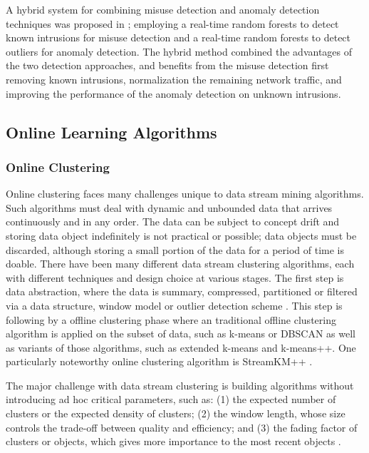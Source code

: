 \documentclass[runningheads]{llncs}
\begin{document}
	A hybrid system for combining misuse detection and anomaly detection techniques was proposed in \cite{Zhang2006}; employing a real-time random forests to detect known intrusions for misuse detection and a real-time random forests to detect outliers for anomaly detection. The hybrid method combined the advantages of the two detection approaches, and benefits from the misuse detection first removing known intrusions, normalization the remaining network traffic, and improving the performance of the anomaly detection on unknown intrusions.
	
	\subsection{Online Learning Algorithms}
	
	\subsubsection{Online Clustering}
	
	Online clustering faces many challenges unique to data stream mining algorithms. Such algorithms must deal with dynamic and unbounded data that arrives continuously and in any order. The data can be subject to concept drift and storing data object indefinitely is not practical or possible; data objects must be discarded, although storing a small portion of the data for a period of time is doable. There have been many different data stream clustering algorithms, each with different techniques and design choice at various stages. The first step is data abstraction, where the data is summary, compressed, partitioned or filtered via a data structure, window model or outlier detection scheme \cite{Silva2013}. This step is following by a offline clustering phase where an traditional offline clustering algorithm is applied on the subset of data, such as k-means or DBSCAN as well as variants of those algorithms, such as extended k-means and k-means++. One particularly noteworthy online clustering algorithm is StreamKM++ \cite{Ackermann2012}. 

	The major challenge with data stream clustering is building algorithms without introducing ad hoc critical parameters, such as: (1) the expected number of clusters or the expected density of clusters; (2) the window length, whose size controls the trade-off between quality and efficiency; and (3) the fading factor of clusters or objects, which gives more importance to the most recent objects \cite{Silva2013}.
\end{document}
